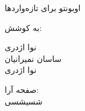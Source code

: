 \thispagestyle{empty}
\begin{center}
\Titrh اوبونتو برای تازه‌واردها\\
\par\vspace{9mm}
\Titrc به کوشش: \\
\par\vspace{9mm}
\Titrc نوا اژدری \\
\Titrc ساسان نمیرانیان \\
\Titrc نوا اژدری \\
\par\vspace{9mm}
\Titrc صفحه آرا: \\
\Yagut شسیشسی
\end {center}
\newpage
